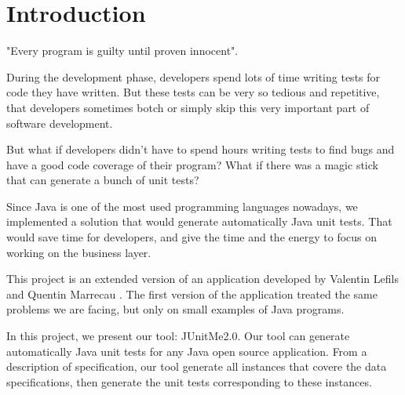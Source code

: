 \chapter*{Introduction}
	\thispagestyle{introduction}
	"Every program is guilty until proven innocent".
	
	During the development phase, developers spend lots of time writing tests for code they have written. But these tests can be very so tedious and repetitive, that developers sometimes botch or simply skip this very important part of software development.
	
	But what if developers didn't have to spend hours writing tests to find bugs and have a good code coverage of their program? What if there was a magic stick that can generate a bunch of unit tests? 
	
Since Java is one of the most used programming languages nowadays, we implemented a solution that would generate automatically Java unit tests. That would save time for developers, and give the time and the energy to focus on working on the business layer.

This project is an extended version of an application developed by Valentin Lefils and Quentin Marrecau \cite{JUnitMeRapport} \cite{JUnitMeGitHub} . The first version of the application treated the same problems we are facing, but only on small examples of Java programs.

In this project, we present our tool: JUnitMe2.0. Our tool can generate automatically Java unit tests for any Java open source application. From a description of specification, our tool generate all instances that covere the data specifications, then generate the unit tests corresponding to these instances.